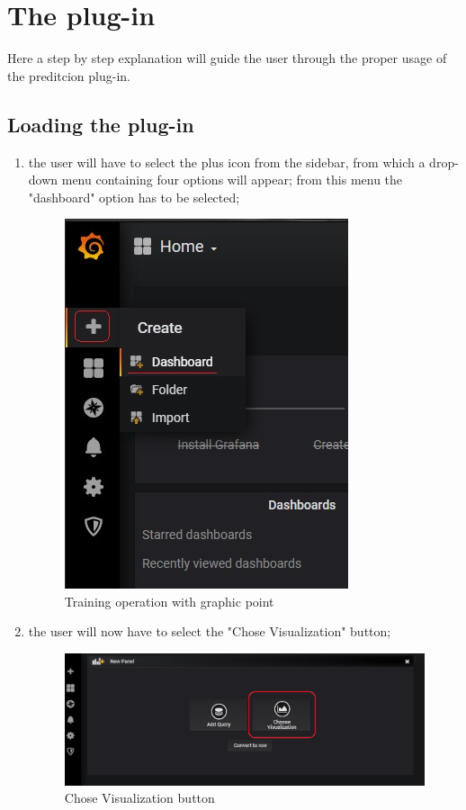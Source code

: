 \section{The plug-in}
Here a step by step explanation will guide the user through the proper usage of the preditcion plug-in.

\subsection{Loading the plug-in}
\begin{enumerate}
	\item the user will have to select the plus icon from the sidebar, from which a drop-down menu containing four options will appear; from this menu the "dashboard" option has to be selected;


\begin{figure}[H]
\centering
\includegraphics[scale=0.90]{img/plug-in/plus_dash.jpg}
\caption{Training operation with graphic point}
\end{figure}


	\item the user will now have to select the "Chose Visualization" button;


\begin{figure}[H]
\centering
\includegraphics[scale=0.65]{img/plug-in/visual.jpg}
\caption{Chose Visualization button}
\end{figure}



\end{enumerate}
